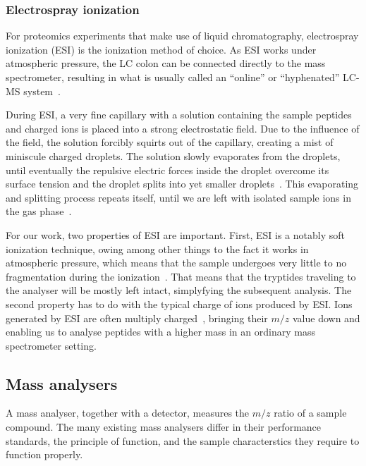 \subsubsection{Electrospray ionization}

For proteomics experiments that make use of liquid chromatography, electrospray ionization (ESI) is the ionization method of choice. As ESI works under atmospheric pressure, the LC colon can be connected directly to the mass spectrometer, resulting in what is usually called an  ``online'' or ``hyphenated'' LC-MS system~\cite{opiteck1997comprehensive}.

During ESI, a very fine capillary with a solution containing the sample peptides and charged ions is placed into a strong electrostatic field. Due to the influence of the field, the solution forcibly squirts out of the capillary, creating a mist of miniscule charged droplets. The solution slowly evaporates from the droplets, until eventually the repulsive electric forces inside the droplet overcome its surface tension and the droplet splits into yet smaller droplets~\cite{rayleigh1882xx}. This evaporating and splitting process repeats itself, until we are left with isolated sample ions in the gas phase~\cite{dole1968molecular,dole1968gas,fenn1989electrospray, fenn1990electrospray}.


For our work, two properties of ESI are important. First, ESI is a notably soft ionization technique, owing among other things to the fact it works in atmospheric pressure, which means that the sample undergoes very little to no fragmentation during the ionization~\cite{griffiths2001electrospray}. That means that the tryptides traveling to the analyser will be mostly left intact, simplyfying the subsequent analysis. The second property has to do with the typical charge of ions produced by ESI\@. Ions generated by ESI are often multiply charged~\cite{felitsyn2002origin}, bringing their \(m/z\) value down and enabling us to analyse peptides with a higher mass in an ordinary mass spectrometer setting.

\subsection{Mass analysers}

A mass analyser, together with a detector, measures the \(m/z\) ratio of a sample compound. The many existing mass analysers differ in their performance standards, the principle of function, and the sample characterstics they require to function properly.

